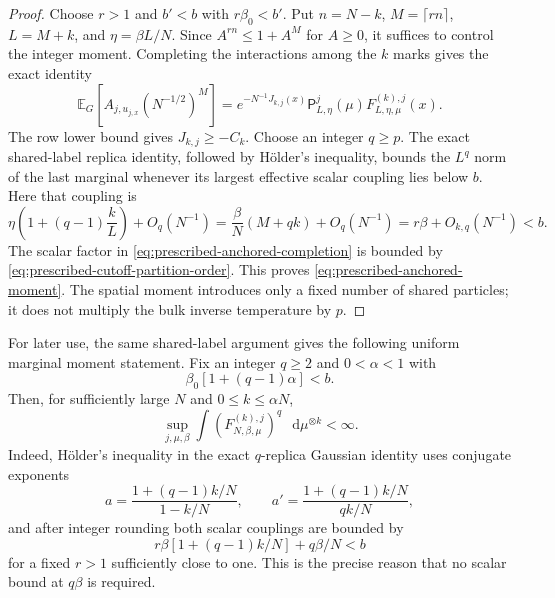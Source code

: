 \documentclass[11pt,reqno]{amsart}
\numberwithin{equation}{section}
\theoremstyle{plain}
\theoremstyle{definition}
\newcommand{\dd}{\mathop{}\!\mathrm d}
\newcommand{\E}{\mathbb E}
\newcommand{\be}{\beta}
\begin{document}
\begin{proof}
Choose $r>1$ and $b'<b$ with $r\be_0<b'$.  Put $n=N-k$, $M=\lceil rn\rceil$, $L=M+k$, and $\eta=\be L/N$.  Since $A^{rn}\leq1+A^M$ for $A\geq0$, it suffices to control the integer moment.  Completing the interactions among the $k$ marks gives the exact identity
\begin{equation}
 \E_G[A_{j,u_{j,x}}(N^{-1/2})^M]
 =e^{-N^{-1}J_{k,j}(x)}
 \mathsf P^j_{L,\eta}(\mu)F_{L,\eta,\mu}^{(k),j}(x).
 \label{eq:prescribed-anchored-completion}
\end{equation}
The row lower bound gives $J_{k,j}\geq-C_k$.  Choose an integer $q\geq p$.  The exact shared-label replica identity, followed by H\"older's inequality, bounds the $L^q$ norm of the last marginal whenever its largest effective scalar coupling lies below $b$.  Here that coupling is
\begin{equation}
 \eta\left(1+(q-1)\frac{k}{L}\right)+O_q(N^{-1})
 =\frac{\be}{N}(M+qk)+O_q(N^{-1})
 =r\be+O_{k,q}(N^{-1})<b.
 \label{eq:prescribed-anchored-effective-temperature}
\end{equation}
The scalar factor in \eqref{eq:prescribed-anchored-completion} is bounded by \eqref{eq:prescribed-cutoff-partition-order}.  This proves \eqref{eq:prescribed-anchored-moment}.  The spatial moment introduces only a fixed number of shared particles; it does not multiply the bulk inverse temperature by $p$.
\end{proof}

For later use, the same shared-label argument gives the following uniform marginal moment statement.  Fix an integer $q\geq2$ and $0<\alpha<1$ with
\begin{equation}
 \be_0[1+(q-1)\alpha]<b.
 \label{eq:prescribed-replica-window}
\end{equation}
Then, for sufficiently large $N$ and $0\leq k\leq\alpha N$,
\begin{equation}
 \sup_{j,\mu,\be}
 \int\left(F_{N,\be,\mu}^{(k),j}\right)^q\,\dd\mu^{\otimes k}<\infty.
 \label{eq:prescribed-replica-Lq}
\end{equation}
Indeed, H\"older's inequality in the exact $q$-replica Gaussian identity uses conjugate exponents
\begin{equation}
 a=\frac{1+(q-1)k/N}{1-k/N},
 \qquad
 a'=\frac{1+(q-1)k/N}{qk/N},
 \label{eq:prescribed-replica-holder-exponents}
\end{equation}
and after integer rounding both scalar couplings are bounded by
\begin{equation}
 r\be[1+(q-1)k/N]+q\be/N<b
 \label{eq:prescribed-replica-effective-temperature}
\end{equation}
for a fixed $r>1$ sufficiently close to one.  This is the precise reason that no scalar bound at $q\be$ is required.
\end{document}
